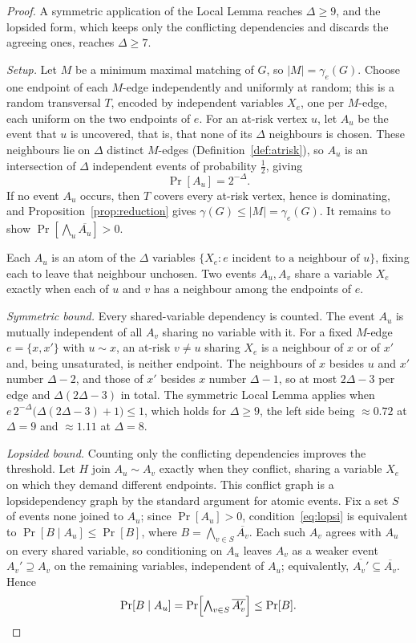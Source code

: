 \documentclass[11pt]{article}
\theoremstyle{definition}
\theoremstyle{remark}
\newcommand{\edom}{\gamma_{e}}
\begin{document}
\begin{proof}
A symmetric application of the Local Lemma
reaches $\Delta \ge 9$, and the lopsided form, which keeps only the conflicting
dependencies and discards the agreeing ones, reaches $\Delta \ge 7$.

\medskip\noindent
\emph{Setup.} Let $M$ be a minimum maximal matching of $G$, so $|M| = \edom(G)$. Choose one
endpoint of each $M$-edge independently and uniformly at random; this is a
random transversal $T$, encoded by independent variables $X_e$, one per $M$-edge,
each uniform on the two endpoints of $e$. For an at-risk vertex $u$, let $A_u$ be
the event that $u$ is uncovered, that is, that none of its $\Delta$ neighbours is
chosen. These neighbours lie on $\Delta$ distinct $M$-edges
(Definition~\ref{def:atrisk}), so $A_u$ is an
intersection of $\Delta$ independent events of probability $\tfrac12$, giving
\[
  \Pr[A_u] = 2^{-\Delta}.
\]
If no event $A_u$ occurs, then $T$ covers every at-risk vertex, hence is
dominating, and Proposition~\ref{prop:reduction} gives
$\gamma(G) \le |M| = \edom(G)$. It remains to show
$\Pr[\bigwedge_u \overline{A_u}] > 0$.

\medskip\noindent
Each $A_u$ is an atom of the $\Delta$ variables $\{X_e : e \text{ incident to a
neighbour of } u\}$, fixing each to leave that neighbour unchosen. Two events
$A_u, A_v$ share a variable $X_e$ exactly when each of $u$ and $v$ has a neighbour
among the endpoints of $e$.

\medskip\noindent
\emph{Symmetric bound.} Every shared-variable dependency is counted. The event
$A_u$ is mutually independent of all $A_v$ sharing no variable with it. For a fixed $M$-edge
$e = \{x, x'\}$ with $u \sim x$, an at-risk $v \neq u$
sharing $X_e$ is a neighbour of $x$ or of $x'$ and, being unsaturated, is
neither endpoint. The
neighbours of $x$ besides $u$ and $x'$ number $\Delta-2$, and those of $x'$
besides $x$ number $\Delta-1$, so at most $2\Delta-3$ per edge and
$\Delta(2\Delta-3)$ in total. The
symmetric Local Lemma applies when $e\,2^{-\Delta}\bigl(\Delta(2\Delta-3)+1\bigr)
\le 1$, which holds for $\Delta \ge 9$, the left side being $\approx 0.72$ at
$\Delta = 9$ and $\approx 1.11$ at $\Delta = 8$.

\medskip\noindent
\emph{Lopsided bound.} Counting only the conflicting dependencies improves the
threshold. Let $H$ join
$A_u \sim A_v$ exactly when they conflict, sharing a variable $X_e$ on which they
demand different endpoints. This conflict graph is a lopsidependency graph by the
standard argument for atomic events. Fix a set $S$ of events none joined to
$A_u$; since $\Pr[A_u] > 0$, condition~\eqref{eq:lopsi} is equivalent to
$\Pr[B \mid A_u] \le \Pr[B]$, where $B = \bigwedge_{v \in S}\overline{A_v}$. Each
such $A_v$ agrees with $A_u$ on every shared variable, so conditioning on
$A_u$ leaves $A_v$ as a weaker event $A_v' \supseteq A_v$ on the remaining variables,
independent of $A_u$; equivalently, $\overline{A_v'} \subseteq \overline{A_v}$. Hence
\[
  \Pr[B \mid A_u] = \Pr\Bigl[\textstyle\bigwedge_{v\in S}\overline{A_v'}\Bigr]
  \le \Pr[B].
\]


\end{proof}
\end{document}
